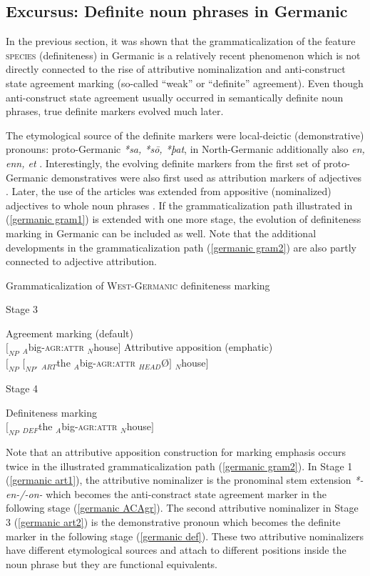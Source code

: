 {\subsection[Definite noun phrases in Germanic]{Excursus: Definite noun phrases in Germanic}
In the previous section, it was shown that the grammaticalization of the feature \textsc{species} (definiteness) in Germanic is a relatively recent phenomenon which is not directly connected to the rise of attributive nominalization and anti-construct state agreement marking (so-called “weak” or “definite” agreement). Even though anti-construct state agreement usually occurred in semantically definite noun phrases, true definite markers evolved much later.

The etymological source of the definite markers were local-deictic (demonstrative) pronouns: proto-Germanic \textit{*sa, *sō, *þat}, in North-Germanic additionally also \textit{en, enn, et} \citep[15]{heinrichs1954}. Interestingly, the evolving definite markers from the first set of proto-Germanic demonstratives were also first used as attribution markers of adjectives  \citep{gamillscheg1937, nocentini1996}. Later, the use of the articles was extended from appositive (nominalized) adjectives to whole noun phrases \citep[63]{philippi1997}. If the grammaticalization path illustrated in (\ref{germanic gram1}) is extended with one more stage, the evolution of definiteness marking in Germanic can be included as well. Note that the additional developments in the grammaticalization path (\ref{germanic gram2}) are also partly connected to adjective attribution.
\newpage
\begin{exe}
\ex Grammaticalization of \textsc{West-Germanic} definiteness marking \label{germanic gram2}
\begin{xlist}
\ex 	Stage 3
\begin{xlist}
\ex 	Agreement marking (default)\\
$[_{NP}$ $_{A}$big-\textsc{agr:attr} $_{N}$house$]$
\ex	Attributive apposition (emphatic)\\
$[_{NP}$ $[_{NP'}$ $_{ART}$the $_{A}$big-\textsc{agr:attr} $_{HEAD}$Ø$]$ $_{N}$house$]$\label{germanic art2}
\end{xlist}
\ex 	Stage 4
\begin{xlist}
\ex	Definiteness marking\\
$[_{NP}$ $_{DEF}$the $_{A}$big-\textsc{agr:attr} $_{N}$house$]$\label{germanic def}
\end{xlist}
\end{xlist}
\end{exe}
Note that an attributive apposition construction for marking emphasis occurs twice in the illustrated grammaticalization path (\ref{germanic gram2}). In Stage 1 (\ref{germanic art1}), the attributive nominalizer is the pronominal stem extension \textit{*-en-/-on-} which becomes the anti-constract state agreement marker in the following stage (\ref{germanic ACAgr}). The second attributive nominalizer in Stage 3 (\ref{germanic art2}) is the demonstrative pronoun which becomes the definite marker in the following stage (\ref{germanic def}). These two attributive nominalizers have different etymological sources and attach to different positions inside the noun phrase but they are functional equivalents.

}

